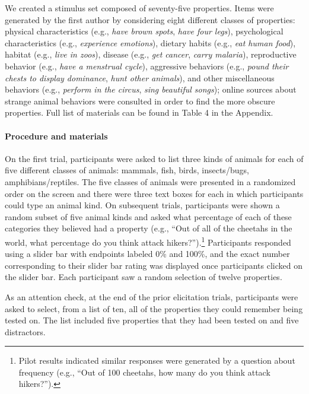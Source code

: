 \documentclass[floatsintext,doc]{apa6}
\let\oldparagraph\paragraph
\renewcommand{\paragraph}[1]{\oldparagraph{#1}\mbox{}}
\let\rmarkdownfootnote\footnote%
\def\footnote{\protect\rmarkdownfootnote}
\begin{document}
We created a stimulus set composed of seventy-five properties.
Items were generated by the first author by considering eight different classes of properties: physical characteristics (e.g., \emph{have brown spots}, \emph{have four legs}), psychological characteristics (e.g., \emph{experience emotions}), dietary habits (e.g., \emph{eat human food}), habitat (e.g., \emph{live in zoos}), disease (e.g., \emph{get cancer}, \emph{carry malaria}), reproductive behavior (e.g., \emph{have a menstrual cycle}), aggressive behaviors (e.g., \emph{pound their chests to display dominance}, \emph{hunt other animals}), and other miscellaneous behaviors (e.g., \emph{perform in the circus}, \emph{sing beautiful songs}); online sources about strange animal behaviors were consulted in order to find the more obscure properties. Full list of materials can be found in Table 4 in the Appendix.

\hypertarget{procedure-and-materials-1}{%
\paragraph{Procedure and materials}\label{procedure-and-materials-1}}

On the first trial, participants were asked to list three kinds of animals for each of five different classes of animals: mammals, fish, birds, insects/bugs, amphibians/reptiles.
The five classes of animals were presented in a randomized order on the screen and there were three text boxes for each in which participants could type an animal kind.
On subsequent trials, participants were shown a random subset of five animal kinds and asked what percentage of each of these categories they believed had a property (e.g., \enquote{Out of all of the cheetahs in the world, what percentage do you think attack hikers?}).\footnote{Pilot results indicated similar responses were generated by a question about frequency (e.g., \enquote{Out of 100 cheetahs, how many do you think attack hikers?}).} 
Participants responded using a slider bar with endpoints labeled 0\% and 100\%, and the exact number corresponding to their slider bar rating was displayed once participants clicked on the slider bar.
Each participant saw a random selection of twelve properties.

As an attention check, at the end of the prior elicitation trials, participants were asked to select, from a list of ten, all of the properties they could remember being tested on.
The list included five properties that they had been tested on and five distractors.
\end{document}
